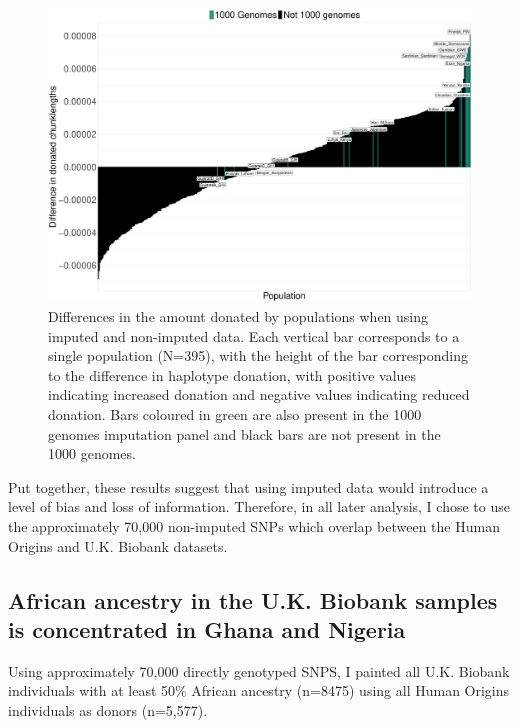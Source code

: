 \begin{figure}
	    \centering
	    \includegraphics[width=1.0\textwidth]{../images/chapter3/imputed_excess_copying_pops.pdf}
	    \caption{Differences in the amount donated by populations when using imputed and non-imputed data. Each vertical bar corresponds to a single population (N=395), with the height of the bar corresponding to the difference in haplotype donation, with positive values indicating increased donation and negative values indicating reduced donation. Bars coloured in green are also present in the 1000 genomes imputation panel and black bars are not present in the 1000 genomes.}
	    \label{fig:imputed_excess_copying_pops}
\end{figure}

Put together, these results suggest that using imputed data would introduce a level of bias and loss of information. Therefore, in all later analysis, I chose to use the approximately 70,000 non-imputed SNPs which overlap between the Human Origins and U.K. Biobank datasets. 

\subsection{African ancestry in the U.K. Biobank samples is concentrated in Ghana and Nigeria}

Using approximately 70,000 directly genotyped SNPS, I painted all U.K. Biobank individuals with at least 50\% African ancestry (n=8475) using all Human Origins individuals as donors (n=5,577).

